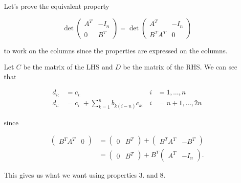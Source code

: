 \begin{solution}

  Let's prove the equivalent property

  \[
    \det\begin{pmatrix}
      A^T & -I_n\\
      0 & B^T
    \end{pmatrix} =
    \det\begin{pmatrix}
      A^T & -I_n\\
      B^TA^T & 0
    \end{pmatrix}
  \]

  to work on the columns since the properties are expressed
  on the columns.

  Let $C$ be the matrix of the LHS and
  $D$ be the matrix of the RHS.
  We can see that

  \begin{align*}
    d_{i:} &= c_{i:} & i & = 1, \ldots, n\\
    d_{i:} &= c_{i:} + \sum_{k=1}^n b_{k(i-n)} c_{k:} & i & = n+1, \ldots, 2n
  \end{align*}

  since

  \begin{align*}
    \begin{pmatrix}
      B^TA^T & 0
    \end{pmatrix}
    & =
    \begin{pmatrix}
      0 & B^T
    \end{pmatrix}
    +
    \begin{pmatrix}
      B^TA^T & -B^T
    \end{pmatrix}\\
    & =
    \begin{pmatrix}
      0 & B^T
    \end{pmatrix}
    +
    B^T
    \begin{pmatrix}
      A^T & -I_n
    \end{pmatrix}.
  \end{align*}

  This gives us what we want using properties 3. and 8.

\end{solution}

